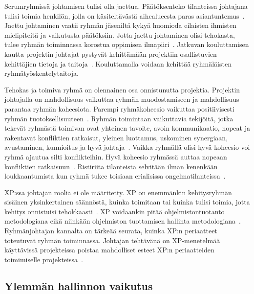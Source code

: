 \documentclass[finnish]{tktltiki2}
\theoremstyle{definition}
\theoremstyle{remark}
\begin{document}
Scrumryhmissä johtamisen tulisi olla jaettua. Päätöksenteko tilanteissa johtajana tulisi toimia henkilön, jolla on käsiteltävästä aihealueesta paras asiantuntemus~\cite{4755768}. Jaettu johtaminen vaatii ryhmän jäseniltä kykyä huomioda eilaisten ihmisten mielipiteitä ja vaikutusta päätöksiin. Jotta jaettu johtaminen olisi tehokasta, tulee ryhmän toiminnassa korostua oppimisen ilmapiiri~\cite{4755768}. Jatkuvan kouluttamisen kautta projektin johtajat pystyvät kehittämään projektiin osallistuvien kehittäjien tietoja ja taitoja~\cite{dall2004project}. Kouluttamalla voidaan kehittää ryhmäläisten ryhmätyöskentelytaitoja. 

Tehokas ja toimiva ryhmä on olennainen osa onnistunutta projektia. Projektin johtajalla on mahdollisuus vaikuttaa ryhmän muodostamiseen ja mahdollisuus parantaa ryhmän koheesiota. Parempi ryhmäkoheesio vaikuttaa positiivisesti ryhmän tuotoksellisuuteen~\cite{bahli2005group, McLeod:2011:FAS:1978802.1978803}. Ryhmän toimintaan vaikuttavia tekijöitä, jotka tekevät ryhmästä toimivan ovat yhteinen tavoite, avoin kommunikaatio, nopeat ja rakentavat konfliktien ratkaisut, yleinen luottamus, uskominen synergiaan, avustaminen, kunnioitus ja hyvä johtaja~\cite{4017705}. Vaikka ryhmällä olisi hyvä koheesio voi ryhmä ajautua silti konflikteihin. Hyvä koheesio ryhmässä auttaa nopeaan konfliktien ratkaisuun~\cite{bradley1997effect}. Ristiriita tilanteista selvitään ilman kenenkään loukkaantumista kun ryhmä tukee toisiaan erialisissa ongelmatilanteissa~\cite{bradley1997effect}.

XP:ssa johtajan roolia ei ole määritetty. XP on enemmänkin kehitysryhmän sisäinen yksinkertainen säännöstä, kuinka toimitaan tai kuinka tulisi toimia, jotta kehitys onnistuisi tehokkaasti~\cite{Augustine:2005:APM:1101779.1101781}. XP voidaankin pitää ohjelmistontuotanto metodologiana eikä niinkään ohjelmiston tuottamisen hallinta metodologiana~\cite{cohen2004introduction}. Ryhmänjohtajan kannalta on tärkeää seurata, kuinka XP:n periaatteet toteutuvat ryhmän toiminnassa. Johtajan tehtävänä on XP-menetelmää käyttävissä projekteissa poistaa mahdolliset esteet XP:n periaatteiden toimimiselle projekteissa~\cite{Augustine:2005:APM:1101779.1101781}.





\subsection{Ylemmän hallinnon vaikutus}
\end{document}
